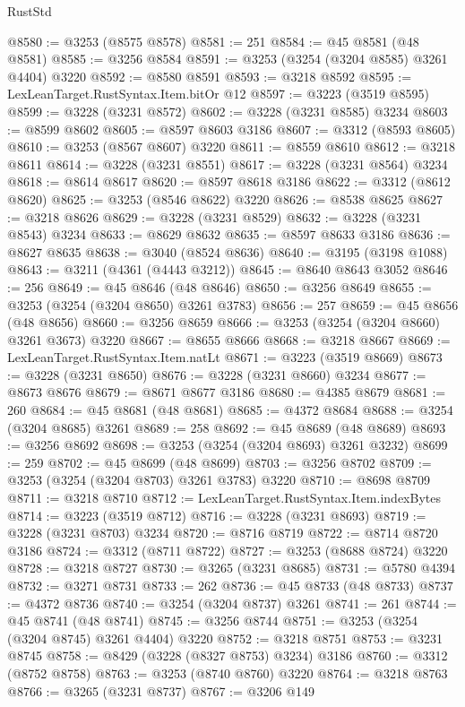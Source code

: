 \begin{lexlean}{RustStd}
\begin{coremodule}
@8580 := @3253 (@8575 @8578)
@8581 := 251
@8584 := @45 @8581 (@48 @8581)
@8585 := @3256 @8584
@8591 := @3253 (@3254 (@3204 @8585) @3261 @4404) @3220
@8592 := @8580 @8591
@8593 := @3218 @8592
@8595 := LexLeanTarget.RustSyntax.Item.bitOr @12
@8597 := @3223 (@3519 @8595)
@8599 := @3228 (@3231 @8572)
@8602 := @3228 (@3231 @8585) @3234
@8603 := @8599 @8602
@8605 := @8597 @8603 @3186
@8607 := @3312 (@8593 @8605)
@8610 := @3253 (@8567 @8607) @3220
@8611 := @8559 @8610
@8612 := @3218 @8611
@8614 := @3228 (@3231 @8551)
@8617 := @3228 (@3231 @8564) @3234
@8618 := @8614 @8617
@8620 := @8597 @8618 @3186
@8622 := @3312 (@8612 @8620)
@8625 := @3253 (@8546 @8622) @3220
@8626 := @8538 @8625
@8627 := @3218 @8626
@8629 := @3228 (@3231 @8529)
@8632 := @3228 (@3231 @8543) @3234
@8633 := @8629 @8632
@8635 := @8597 @8633 @3186
@8636 := @8627 @8635
@8638 := @3040 (@8524 @8636)
@8640 := @3195 (@3198 @1088)
@8643 := @3211 (@4361 (@4443 @3212))
@8645 := @8640 @8643 @3052
@8646 := 256
@8649 := @45 @8646 (@48 @8646)
@8650 := @3256 @8649
@8655 := @3253 (@3254 (@3204 @8650) @3261 @3783)
@8656 := 257
@8659 := @45 @8656 (@48 @8656)
@8660 := @3256 @8659
@8666 := @3253 (@3254 (@3204 @8660) @3261 @3673) @3220
@8667 := @8655 @8666
@8668 := @3218 @8667
@8669 := LexLeanTarget.RustSyntax.Item.natLt
@8671 := @3223 (@3519 @8669)
@8673 := @3228 (@3231 @8650)
@8676 := @3228 (@3231 @8660) @3234
@8677 := @8673 @8676
@8679 := @8671 @8677 @3186
@8680 := @4385 @8679
@8681 := 260
@8684 := @45 @8681 (@48 @8681)
@8685 := @4372 @8684
@8688 := @3254 (@3204 @8685) @3261
@8689 := 258
@8692 := @45 @8689 (@48 @8689)
@8693 := @3256 @8692
@8698 := @3253 (@3254 (@3204 @8693) @3261 @3232)
@8699 := 259
@8702 := @45 @8699 (@48 @8699)
@8703 := @3256 @8702
@8709 := @3253 (@3254 (@3204 @8703) @3261 @3783) @3220
@8710 := @8698 @8709
@8711 := @3218 @8710
@8712 := LexLeanTarget.RustSyntax.Item.indexBytes
@8714 := @3223 (@3519 @8712)
@8716 := @3228 (@3231 @8693)
@8719 := @3228 (@3231 @8703) @3234
@8720 := @8716 @8719
@8722 := @8714 @8720 @3186
@8724 := @3312 (@8711 @8722)
@8727 := @3253 (@8688 @8724) @3220
@8728 := @3218 @8727
@8730 := @3265 (@3231 @8685)
@8731 := @5780 @4394
@8732 := @3271 @8731
@8733 := 262
@8736 := @45 @8733 (@48 @8733)
@8737 := @4372 @8736
@8740 := @3254 (@3204 @8737) @3261
@8741 := 261
@8744 := @45 @8741 (@48 @8741)
@8745 := @3256 @8744
@8751 := @3253 (@3254 (@3204 @8745) @3261 @4404) @3220
@8752 := @3218 @8751
@8753 := @3231 @8745
@8758 := @8429 (@3228 (@8327 @8753) @3234) @3186
@8760 := @3312 (@8752 @8758)
@8763 := @3253 (@8740 @8760) @3220
@8764 := @3218 @8763
@8766 := @3265 (@3231 @8737)
@8767 := @3206 @149

\end{coremodule}
\end{lexlean}
